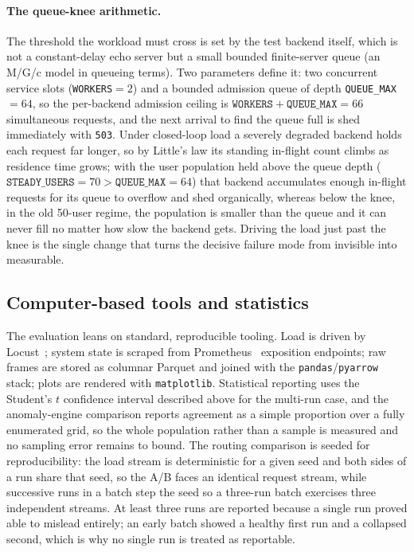 \paragraph{The queue-knee arithmetic.} The threshold the workload must cross is set by
the test backend itself, which is not a constant-delay echo server but a small bounded
finite-server queue (an M/G/c model in queueing terms). Two parameters define it: two
concurrent service slots (\texttt{WORKERS}$=2$) and a bounded admission queue of depth
\texttt{QUEUE\_MAX}$=64$, so the per-backend admission ceiling is
$\texttt{WORKERS}+\texttt{QUEUE\_MAX}=66$ simultaneous requests, and the next arrival to
find the queue full is shed immediately with \texttt{503}. Under closed-loop load a
severely degraded backend holds each request far longer, so by Little's law its standing
in-flight count climbs as residence time grows; with the user population held above the
queue depth ($\texttt{STEADY\_USERS}=70>\texttt{QUEUE\_MAX}=64$) that backend accumulates
enough in-flight requests for its queue to overflow and shed organically, whereas below
the knee, in the old 50-user regime, the population is smaller than the queue and it can
never fill no matter how slow the backend gets. Driving the load just past the knee is
the single change that turns the decisive failure mode from invisible into measurable.

\subsection{Computer-based tools and statistics}\label{imc:tools}

The evaluation leans on standard, reproducible tooling. Load is driven by
Locust~\cite{locust}; system state is scraped from Prometheus~\cite{prometheus}
exposition endpoints; raw frames are stored as columnar Parquet and joined with the
\texttt{pandas}/\texttt{pyarrow} stack; plots are rendered with \texttt{matplotlib}.
Statistical reporting uses the Student's $t$ confidence interval described above for
the multi-run case, and the anomaly-engine comparison reports agreement as a simple
proportion over a fully enumerated grid, so the whole population rather than a sample
is measured and no sampling error remains to bound. The routing comparison is seeded for
reproducibility: the load stream is deterministic for a given seed and both sides of a
run share that seed, so the A/B faces an identical request stream, while successive runs
in a batch step the seed so a three-run batch exercises three independent streams. At
least three runs are reported because a single run proved able to mislead entirely; an
early batch showed a healthy first run and a collapsed second, which is why no single run
is treated as reportable.

